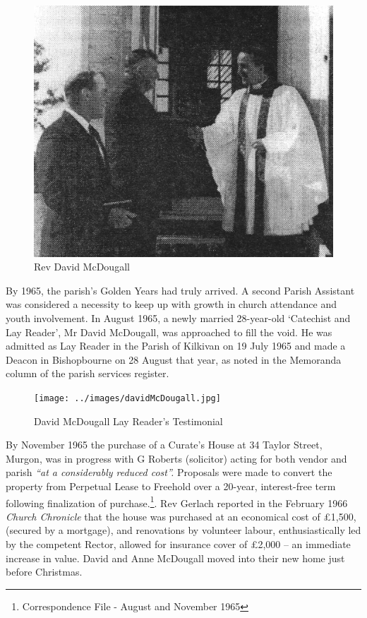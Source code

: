 \begin{figure}
\begin{center}
\includegraphics[width=1.\linewidth,center]{../images/DMcDougall.jpg}
\caption{Rev David McDougall}
\end{center}
\end{figure}




By 1965, the parish's Golden Years had truly arrived. A second Parish Assistant was considered a necessity to keep up with growth in church attendance and youth involvement. In August 1965, a newly married 28-year-old `Catechist and Lay Reader', Mr David McDougall, was approached to fill the void. He was admitted as Lay Reader in the Parish of Kilkivan on 19 July 1965 and made a Deacon in Bishopbourne on 28 August that year, as noted in the Memoranda column of the parish services register.









\begin{figure}[!htb]
\begin{center}
\texttt{[image: ../images/davidMcDougall.jpg]}
\caption{David McDougall Lay Reader's Testimonial}
\end{center}
\end{figure}




By November 1965 the purchase of a Curate's House at 34 Taylor Street, Murgon, was in progress with G Roberts (solicitor) acting for both vendor and parish \emph{``at a considerably reduced cost''.} Proposals were made to convert the property from Perpetual Lease to Freehold over a 20-year, interest-free term following finalization of purchase.\footnote{Correspondence File - August and November 1965}. Rev Gerlach reported in the February 1966 \emph{Church Chronicle} that the house was purchased at an economical cost of \pounds1,500, (secured by a mortgage), and renovations by volunteer labour, enthusiastically led by the competent Rector, allowed for insurance cover of \pounds2,000 -- an immediate increase in value. David and Anne McDougall moved into their new home just before Christmas.


